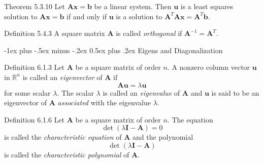 \documentclass[10pt,landscape]{article}
\makeatletter
\renewcommand{\section}{\@startsection{section}{1}{0mm}%
                                {-1ex plus -.5ex minus -.2ex}%
                                {0.5ex plus .2ex}%
                                {\normalfont\large\bfseries}}
\newcommand{\matr}[1]{\bm{#1}}
\newcommand{\vect}[1]{\bm{#1}}
\theoremstyle{definition}
\newcommand{\thistheoremname}{}
\newtheorem*{genericthm*}{\thistheoremname}
\newenvironment{namedthm*}[1]
{\renewcommand{\thistheoremname}{#1}\begin{genericthm*}}
{\end{genericthm*}}
\makeatother
\begin{document}
\begin{multicols}{3}
\begin{namedthm*}{Theorem 5.3.10}
    Let \(\matr{A}\vect{x} = \vect{b}\) be a linear system. Then \(\vect{u}\) is a least squares solution to \(\matr{A}\vect{x} = \vect{b}\) if and only if \(\vect{u}\) is a solution to \(\matr{A}^T\matr{A}\vect{x} = \matr{A}^T\vect{b}\).
\end{namedthm*}

\begin{namedthm*}{Definition 5.4.3}
    A square matrix \(\matr{A}\) is called \textit{orthogonal} if \(\matr{A}^{-1} = \matr{A}^T\).
\end{namedthm*}

\section{Eigens and Diagonalization}

\begin{namedthm*}{Definition 6.1.3}
    Let \(\matr{A}\) be a square matrix of order \(n\). A nonzero column vector \(\vect{u}\) in \(\mathbb{R}^n\) is called an \textit{eigenvector} of \(\matr{A}\) if
    \[
        \matr{A}\vect{u} = \lambda\vect{u}
    \]
    for some scalar \(\lambda\). The scalar \(\lambda\) is called an \textit{eigenvalue} of \(\matr{A}\) and \(\vect{u}\) is said to be an eigenvector of \(\matr{A}\) \textit{associated} with the eigenvalue \(\lambda\).
\end{namedthm*}

\begin{namedthm*}{Definition 6.1.6}
    Let \(\matr{A}\) be a square matrix of order \(n\). The equation
    \[
        \det(\lambda\matr{I} - \matr{A}) = 0
    \]
    is called the \textit{characteristic equation} of \(\matr{A}\) and the polynomial
    \[
        \det(\lambda\matr{I} - \matr{A})
    \]
    is called the \textit{characteristic polynomial} of \(\matr{A}\).
\end{namedthm*}


\end{multicols}
\end{document}
